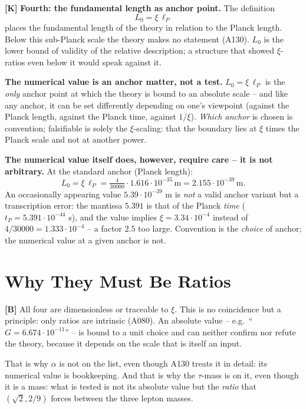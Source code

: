 \textbf{[K]} \textbf{Fourth: the fundamental length as anchor point.} The
definition
\[
  L_0 = \xi\,\ell_P
\]
places the fundamental length of the theory in relation to the Planck length.
Below this sub-Planck scale the theory makes no statement (A130). $L_0$ is the
lower bound of validity of the relative description; a structure that showed
$\xi$-ratios even below it would speak against it.

\textbf{The numerical value is an anchor matter, not a test.} $L_0 = \xi\,\ell_P$
is the \emph{only} anchor point at which the theory is bound to an absolute scale
-- and like any anchor, it can be set differently depending on one's viewpoint
(against the Planck length, against the Planck time, against $1/\xi$). \emph{Which
anchor} is chosen is convention; falsifiable is solely the $\xi$-scaling: that the
boundary lies at $\xi$ times the Planck scale and not at another power.

\textbf{The numerical value itself does, however, require care -- it is not
arbitrary.} At the standard anchor (Planck length):
\[
  L_0 = \xi\,\ell_P = \tfrac{4}{30000}\cdot 1{.}616\cdot10^{-35}\,\text{m}
       = 2{.}155\cdot10^{-39}\,\text{m}.
\]
An occasionally appearing value $5{.}39\cdot10^{-39}$ m is \emph{not} a valid
anchor variant but a transcription error: the mantissa $5{.}391$ is that of the
Planck \emph{time} ($t_P = 5{.}391\cdot10^{-44}$ s), and the value implies
$\xi = 3{.}34\cdot10^{-4}$ instead of $4/30000 = 1{.}333\cdot10^{-4}$ -- a
factor $2{.}5$ too large. Convention is the \emph{choice} of anchor; the
numerical value at a given anchor is not.

\section{Why They Must Be Ratios}

\textbf{[B]} All four are dimensionless or traceable to $\xi$. This is no
coincidence but a principle: only ratios are intrinsic (A080). An absolute value
-- e.g.\ ``$G = 6{.}674\cdot10^{-11}$'' -- is bound to a unit choice and can
neither confirm nor refute the theory, because it depends on the scale that is
itself an input.

That is why $\alpha$ is not on the list, even though A130 treats it in detail:
its numerical value is bookkeeping. And that is why the $\tau$-mass is on it,
even though it is a mass: what is tested is not its absolute value but the
\emph{ratio} that $(\sqrt2, 2/9)$ forces between the three lepton masses.

